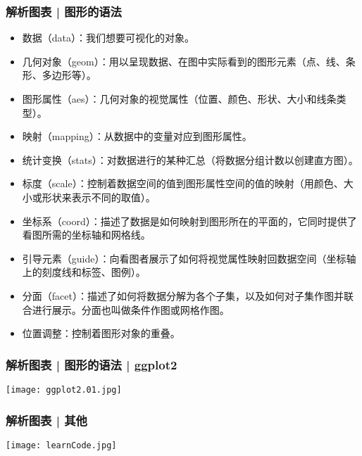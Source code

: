 \begin{frame}
  \frametitle{解析图表 | 图形的语法}
\begin{itemize}
  \item 数据（data）：我们想要可视化的对象。
  \item 几何对象（geom）：用以呈现数据、在图中实际看到的图形元素（点、线、条形、多边形等）。
  \item 图形属性（aes）：几何对象的视觉属性（位置、颜色、形状、大小和线条类型）。
  \item 映射（mapping）：从数据中的变量对应到图形属性。
  \item 统计变换（stats）：对数据进行的某种汇总（将数据分组计数以创建直方图）。
  \item 标度（scale）：控制着数据空间的值到图形属性空间的值的映射（用颜色、大小或形状来表示不同的取值）。
  \item 坐标系（coord）：描述了数据是如何映射到图形所在的平面的，它同时提供了看图所需的坐标轴和网格线。
  \item 引导元素（guide）：向看图者展示了如何将视觉属性映射回数据空间（坐标轴上的刻度线和标签、图例）。
  \item 分面（facet）：描述了如何将数据分解为各个子集，以及如何对子集作图并联合进行展示。分面也叫做条件作图或网格作图。
  \item 位置调整：控制着图形对象的重叠。
\end{itemize}
\end{frame}

\begin{frame}
  \frametitle{解析图表 | 图形的语法 | ggplot2}
  \begin{center}
    \texttt{[image: ggplot2.01.jpg]}
  \end{center}
\end{frame}

\begin{frame}
  \frametitle{解析图表 | 其他}
  \begin{center}
    \texttt{[image: learnCode.jpg]}
  \end{center}
\end{frame}

